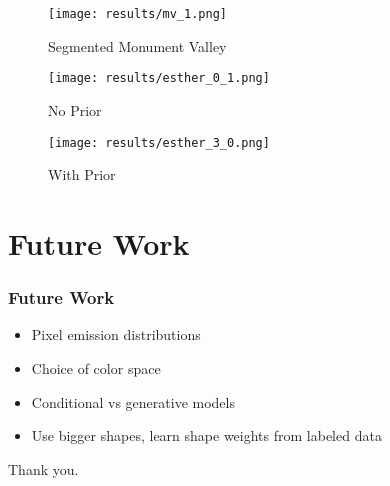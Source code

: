 \documentclass{beamer}
\begin{document}
\begin{frame}
\begin{figure}
    \begin{center}
        \texttt{[image: results/mv\_1.png]}
    \end{center}
    \caption{Segmented Monument Valley}
    \label{fig:mv}
\end{figure}
\end{frame}

\begin{frame}
\begin{figure}
    \begin{center}
        \texttt{[image: results/esther\_0\_1.png]}
    \end{center}
    \caption{No Prior}
\end{figure}

\begin{figure}
    \begin{center}
        \texttt{[image: results/esther\_3\_0.png]}
    \end{center}
    \caption{With Prior}
\end{figure}
\end{frame}

\section{Future Work}
\begin{frame}
    \frametitle{Future Work}
    \begin{itemize}
        \item Pixel emission distributions
        \item Choice of color space
        \item Conditional vs generative models
        \item Use bigger shapes, learn shape weights from labeled data
    \end{itemize}
\end{frame}

\begin{frame}
    \begin{center}
        Thank you.
    \end{center}
\end{frame}
\end{document}

